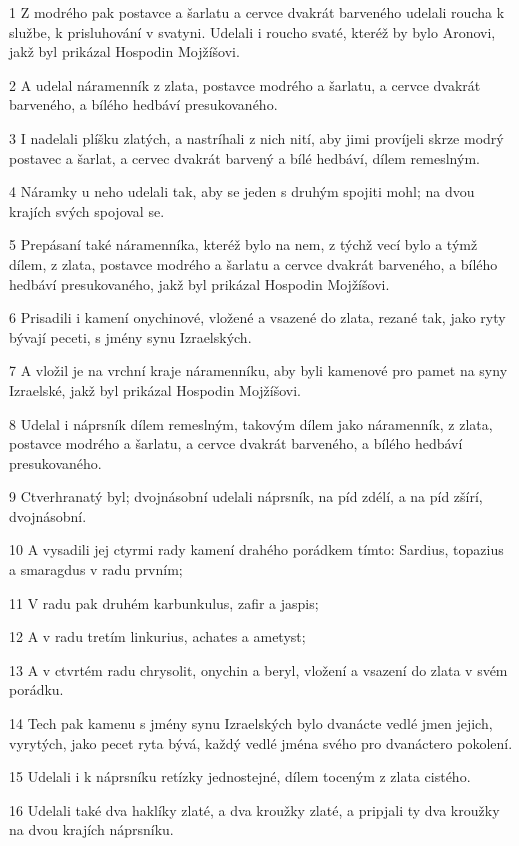 \par 1 Z modrého pak postavce a šarlatu a cervce dvakrát barveného udelali roucha k službe, k prisluhování v svatyni. Udelali i roucho svaté, kteréž by bylo Aronovi, jakž byl prikázal Hospodin Mojžíšovi.
\par 2 A udelal náramenník z zlata, postavce modrého a šarlatu, a cervce dvakrát barveného, a bílého hedbáví presukovaného.
\par 3 I nadelali plíšku zlatých, a nastríhali z nich nití, aby jimi províjeli skrze modrý postavec a šarlat, a cervec dvakrát barvený a bílé hedbáví, dílem remeslným.
\par 4 Náramky u neho udelali tak, aby se jeden s druhým spojiti mohl; na dvou krajích svých spojoval se.
\par 5 Prepásaní také náramenníka, kteréž bylo na nem, z týchž vecí bylo a týmž dílem, z zlata, postavce modrého a šarlatu a cervce dvakrát barveného, a bílého hedbáví presukovaného, jakž byl prikázal Hospodin Mojžíšovi.
\par 6 Prisadili i kamení onychinové, vložené a vsazené do zlata, rezané tak, jako ryty bývají peceti, s jmény synu Izraelských.
\par 7 A vložil je na vrchní kraje náramenníku, aby byli kamenové pro pamet na syny Izraelské, jakž byl prikázal Hospodin Mojžíšovi.
\par 8 Udelal i náprsník dílem remeslným, takovým dílem jako náramenník, z zlata, postavce modrého a šarlatu, a cervce dvakrát barveného, a bílého hedbáví presukovaného.
\par 9 Ctverhranatý byl; dvojnásobní udelali náprsník, na píd zdélí, a na píd zšírí, dvojnásobní.
\par 10 A vysadili jej ctyrmi rady kamení drahého porádkem tímto: Sardius, topazius a smaragdus v radu prvním;
\par 11 V radu pak druhém karbunkulus, zafir a jaspis;
\par 12 A v radu tretím linkurius, achates a ametyst;
\par 13 A v ctvrtém radu chrysolit, onychin a beryl, vložení a vsazení do zlata v svém porádku.
\par 14 Tech pak kamenu s jmény synu Izraelských bylo dvanácte vedlé jmen jejich, vyrytých, jako pecet ryta bývá, každý vedlé jména svého pro dvanáctero pokolení.
\par 15 Udelali i k náprsníku retízky jednostejné, dílem toceným z zlata cistého.
\par 16 Udelali také dva haklíky zlaté, a dva kroužky zlaté, a pripjali ty dva kroužky na dvou krajích náprsníku.
